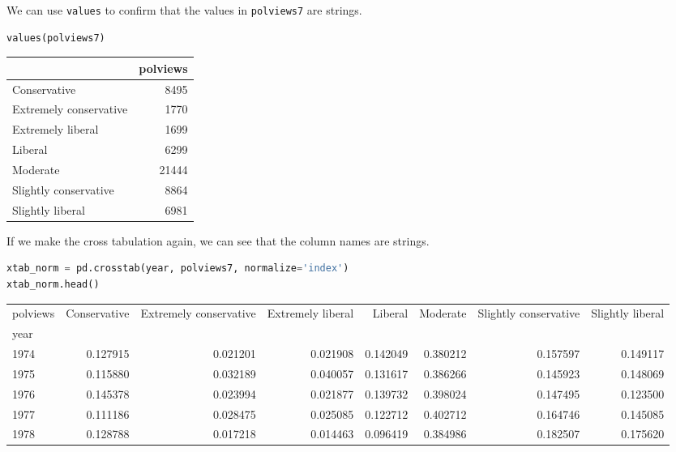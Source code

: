 We can use \passthrough{\lstinline!values!} to confirm that the values
in \passthrough{\lstinline!polviews7!} are strings.

\begin{lstlisting}[language=Python]
values(polviews7)
\end{lstlisting}

\begin{tabular}{lr}
\toprule
{} &  polviews \\
\midrule
Conservative           &      8495 \\
Extremely conservative &      1770 \\
Extremely liberal      &      1699 \\
Liberal                &      6299 \\
Moderate               &     21444 \\
Slightly conservative  &      8864 \\
Slightly liberal       &      6981 \\
\bottomrule
\end{tabular}

If we make the cross tabulation again, we can see that the column names
are strings.

\begin{lstlisting}[language=Python]
xtab_norm = pd.crosstab(year, polviews7, normalize='index')
xtab_norm.head()
\end{lstlisting}

\begin{tabular}{lrrrrrrr}
\toprule
polviews &  Conservative &  Extremely conservative &  Extremely liberal &   Liberal &  Moderate &  Slightly conservative &  Slightly liberal \\
year &               &                         &                    &           &           &                        &                   \\
\midrule
1974 &      0.127915 &                0.021201 &           0.021908 &  0.142049 &  0.380212 &               0.157597 &          0.149117 \\
1975 &      0.115880 &                0.032189 &           0.040057 &  0.131617 &  0.386266 &               0.145923 &          0.148069 \\
1976 &      0.145378 &                0.023994 &           0.021877 &  0.139732 &  0.398024 &               0.147495 &          0.123500 \\
1977 &      0.111186 &                0.028475 &           0.025085 &  0.122712 &  0.402712 &               0.164746 &          0.145085 \\
1978 &      0.128788 &                0.017218 &           0.014463 &  0.096419 &  0.384986 &               0.182507 &          0.175620 \\
\bottomrule
\end{tabular}

